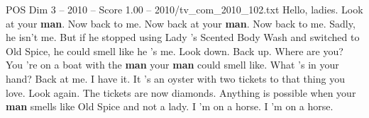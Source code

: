 \begin{textsample}{POS Dim 3 – 2010 – Score 1.00 – 2010/tv\_com\_2010\_102.txt}  \label{ex:f3_pos_048}
Hello, ladies.
Look at your \textbf{man}.
Now back to me.
Now back at your \textbf{man}.
Now back to me.
Sadly, he isn't me.
But if he stopped using Lady 's Scented Body Wash and switched to Old Spice, he could smell like he 's me.
Look down.
Back up.
Where are you?
You 're on a boat with the \textbf{man} your \textbf{man} could smell like.
What 's in your hand?
Back at me.
I have it.
It 's an oyster with two tickets to that thing you love.
Look again.
The tickets are now diamonds.
Anything is possible when your \textbf{man} smells like Old Spice and not a lady.
I 'm on a horse.
I 'm on a horse.

\end{textsample}
